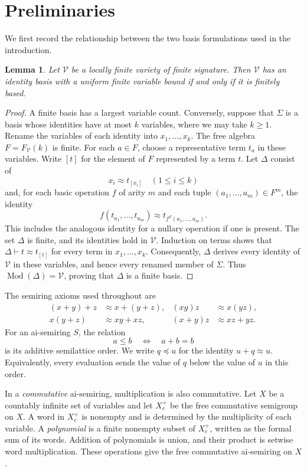 \documentclass[11pt,reqno]{amsart}
\numberwithin{equation}{section}
\newtheorem{lemma}[theorem]{Lemma}
\theoremstyle{definition}
\theoremstyle{remark}
\newcommand{\eqid}{\approx}
\begin{document}
\section{Preliminaries}
\label{sec:prelim}

We first record the relationship between the two basis formulations
used in the introduction.

\begin{lemma}\label{lem:localfinite}
Let $\mathcal V$ be a locally finite variety of finite signature.
Then $\mathcal V$ has an identity basis with a uniform finite
variable bound if and only if it is finitely based.
\end{lemma}

\begin{proof}
A finite basis has a largest variable count. Conversely, suppose
that $\Sigma$ is a basis whose identities have at most $k$ variables,
where we may take $k\geq1$. Rename the variables of each identity
into $x_1,\ldots,x_k$. The free algebra $F=F_{\mathcal V}(k)$ is
finite. For each $a\in F$, choose a representative term $t_a$
in these variables. Write $[t]$ for the element of $F$ represented
by a term $t$. Let $\Delta$ consist of
\[
x_i\eqid t_{[x_i]}\quad(1\leq i\leq k)
\]
and, for each basic operation $f$ of arity $m$ and each tuple
$(a_1,\ldots,a_m)\in F^m$, the identity
\[
f(t_{a_1},\ldots,t_{a_m})
\eqid t_{f^F(a_1,\ldots,a_m)}.
\]
This includes the analogous identity for a nullary operation if
one is present. The set $\Delta$ is finite, and its identities
hold in $\mathcal V$. Induction on terms shows that
$\Delta\vdash t\eqid t_{[t]}$ for every term in $x_1,\ldots,x_k$.
Consequently, $\Delta$ derives every identity of $\mathcal V$
in these variables, and hence every renamed member of $\Sigma$.
Thus $\operatorname{Mod}(\Delta)=\mathcal V$, proving that
$\Delta$ is a finite basis.
\end{proof}

The semiring axioms used throughout are
\[
\begin{aligned}
(x+y)+z&\eqid x+(y+z), & (xy)z&\eqid x(yz),\\
x(y+z)&\eqid xy+xz, & (x+y)z&\eqid xz+yz.
\end{aligned}
\]
For an ai-semiring $S$, the relation
\[
a\leq b\quad\Longleftrightarrow\quad a+b=b
\]
is its additive semilattice order. We write $q\preceq u$ for the
identity $u+q\eqid u$. Equivalently, every evaluation sends the value
of $q$ below the value of $u$ in this order.

In a \emph{commutative} ai-semiring, multiplication is also commutative.
Let $X$ be a countably infinite set of variables and let $X_c^+$ be the
free commutative semigroup on $X$. A word in $X_c^+$ is nonempty and is
determined by the multiplicity of each variable. A \emph{polynomial}
is a finite nonempty subset of $X_c^+$, written as the formal sum of
its words. Addition of polynomials is union, and their product is
setwise word multiplication. These operations give the free
commutative ai-semiring on $X$.
\end{document}
